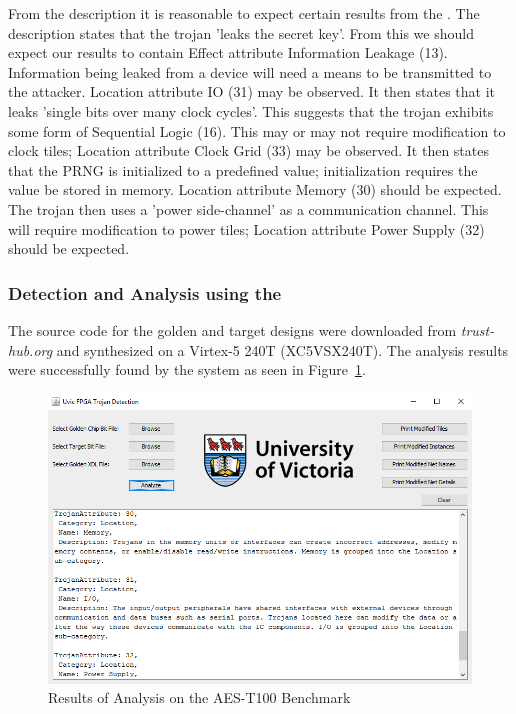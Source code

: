 From the description it is reasonable to expect certain results from the \Name.
The description states that the trojan 'leaks the secret key'.
From this we should expect our results to contain Effect attribute Information Leakage (13).
Information being leaked from a device will need a means to be transmitted to the attacker.
Location attribute \acrshort{IO} (31) may be observed.
It then states that it leaks 'single bits over many clock cycles'. 
This suggests that the trojan exhibits some form of Sequential Logic (16).
This may or may not require modification to clock tiles; Location attribute Clock Grid (33) may be observed. 
It then states that the PRNG is initialized to a predefined value; initialization requires the value be stored in memory. 
Location attribute Memory (30) should be expected.
The trojan then uses a 'power side-channel' as a communication channel.
This will require modification to power tiles; Location attribute Power Supply (32) should be expected.

\subsubsection{Detection and Analysis using the \Name}
The source code for the \gls{golden} and \gls{target} designs were downloaded from \textit{trust-hub.org} and synthesized on a Virtex-5 240T  (XC5VSX240T).
The analysis results were successfully found by the system as seen in Figure~\ref{fig:aesResult}.
\begin{figure}
\centering
\includegraphics[width=1\linewidth]{Figures/aesResult}
\caption[Results of Analysis on the AES-T100 Benchmark]{Results of Analysis on the AES-T100 Benchmark}
\label{fig:aesResult}
\end{figure}

